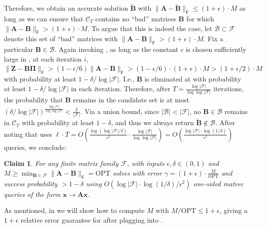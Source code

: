 \documentclass{article}[11pt]
\newtheorem{claim}{Claim}
\theoremstyle{definition}
\newcommand{\bv}[1]{\boldsymbol{\mathbf{#1}}}
\newcommand{\Fro}{\mathsf{F}}
\newcommand{\F}{\mathcal{F}}
\newcommand{\OPT}{\mathrm{OPT}}
\begin{document}
    Therefore, we obtain an accurate solution $\bv{\tilde B}$ with $\|\bv{A} -\bv{\tilde B}\|_\Fro \leq (1+\epsilon) \cdot M$ as long as we can ensure that $\mathcal{C}_{T}$ 
    contains no ``bad'' matrices $\bv{B}$ for which $\|\bv{A} - \bv{B}\|_\Fro > (1+\epsilon) \cdot M$. To argue that this is indeed the case, let $\mathcal{B}\subset \mathcal{F}$ denote this set of ``bad'' matrices with $\|\bv{A} - \bv{B}\|_\Fro > (1+\epsilon) \cdot M$. %
    Fix a particular ${\bv{B}} \in \mathcal{B}$. Again invoking , as long as the constant $c$ is chosen sufficiently large in , at each iteration $i$, $\|\bv{Z} - {\bv{B}}\bv{\Pi}\|_\Fro > (1-\epsilon/6)\|\bv{A} - {\bv{B}}\|_\Fro > (1-\epsilon/6)\cdot (1+\epsilon) \cdot M> (1+\epsilon/2) \cdot M$  
    with probability at least $1-{\delta}/{\log|\F|}$. I.e., $\bv B$ is eliminated at  with probability at least $1-{\delta}/{\log|\F|}$ in each iteration. Therefore, after $T  = \frac{\log|\F|}{\log \log |\F|}$ iterations, the probability that ${\bv{B}}$ remains in the candidate set is at most $({\delta}/{\log|\F|} )^{\frac{\log|\F|}{\log \log |\F|}} < \frac{\delta}{|\mathcal{F}|}$. 
    Via a union bound, since $|\mathcal{B}| < |\mathcal{F}|$, no ${\bv{B}} \in \mathcal{B}$ remains in $\mathcal{C}_{T}$ with probability at least $1-\delta$, and thus we always return $\bv{\tilde B} \notin \mathcal{B}$.
    After noting that  uses $\ell \cdot T = O \left (\frac{\log(\log|\F|/\delta)}{\epsilon^2} \cdot \frac{\log|\F|}{\log\log|\F|} \right ) = O \left (\frac{\log|\F| \cdot \log(1/\delta)}{\epsilon^2}\right)$ queries,
    we conclude:
    \begin{claim}
    \label{claim:one_sided_cutting_method} 
    For any finite matrix family $\mathcal{F}$,  with inputs $\epsilon,\delta \in (0,1)$ and $M \ge \min_{\bv{B}\in \F} \|\bv{A} - \bv{B}\|_\Fro = \OPT$
     solves  with error $\gamma = (1+\epsilon) \cdot \frac{M}{\OPT}$ and success probability $> 1-\delta$ using ${O}(\log|\F| \cdot \log(1/\delta)/\epsilon^2)$ one-sided matvec queries of the form $\bv x \rightarrow \bv{A}\bv x$.
    \end{claim}
As mentioned, in  we will show how to compute $M$ with $M/\OPT \le 1+\epsilon$, giving a $1+\epsilon$ relative error guarantee for  after plugging into .
\end{document}
